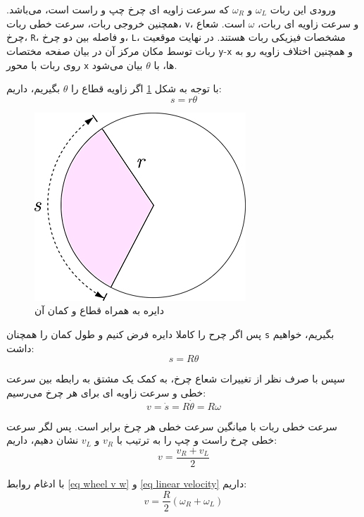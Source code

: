 ورودی این ربات $\omega_L$ و $\omega_R$ که سرعت زاویه ای چرخ چپ و راست است، می‌باشد. همچنین خروجی ربات، سرعت خطی ربات، 
\verb|v|، و سرعت زاویه ای ربات، $\omega$ است. شعاع چرخ، 
\verb|R|، و فاصله بین دو چرخ، 
\verb|L|، مشخصات فیزیکی ربات هستند. در نهایت موقعیت ربات توسط مکان مرکز آن در بیان صفحه مختصات 
\verb|y|-\verb|x| و همچنین اختلاف زاویه رو به روی ربات با محور 
 \verb|x|  ها، با $\theta$ بیان می‌شود.

با توجه به شکل \ref{Fig circle-arc} اگر زاویه قطاع را $\theta$ بگیریم، داریم:
\begin{equation}
s = r\theta
\end{equation}

\begin{figure}[!h] 
	\centering
	\includegraphics[scale=2]{Images/Circle_arc2.jpg}
	\caption{دایره به همراه قطاع و کمان آن} \label{Fig circle-arc}
\end{figure}

پس اگر چرح را کاملا دایره فرض کنیم و طول کمان را همچنان \verb|s| بگیریم، خواهیم داشت:
\begin{equation}
s = R\theta
\end{equation}

سپس با صرف نظر از تغییرات شعاع چرخ، به کمک یک مشتق به رابطه بین سرعت خطی و سرعت زاویه ای برای هر چرخ می‌رسیم:
\begin{equation} \label{eq wheel v w}
v = \dot{s} = R\dot{\theta} = R\omega
\end{equation}

سرعت خطی ربات با میانگین سرعت خطی هر چرخ برابر است. پس لگر سرعت خطی چرخ راست و چپ را به ترتیب با $v_{R}$ و $v_{L}$ نشان دهیم، داریم:
\begin{equation} \label{eq linear velocity}
v = \frac{v_R + v_L}{2}
\end{equation}

با ادغام روابط \ref{eq wheel v w} و \ref{eq linear velocity} داریم:
\begin{equation} \label{eq forward kinematics v}
v = \frac{R}{2}(\omega_R + \omega_L)
\end{equation}

